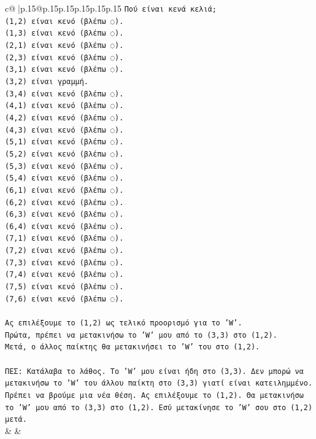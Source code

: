 \documentclass{article}
\begin{document}
{\begin{supertabular}{c@{$\;$}|p{.15\linewidth}@{}p{.15\linewidth}p{.15\linewidth}p{.15\linewidth}p{.15\linewidth}p{.15\linewidth}}
{{{\texttt{Πού είναι κενά κελιά;} \\
\texttt{(1,2) είναι κενό (βλέπω ◌).} \\
\texttt{(1,3) είναι κενό (βλέπω ◌).} \\
\texttt{(2,1) είναι κενό (βλέπω ◌).} \\
\texttt{(2,3) είναι κενό (βλέπω ◌).} \\
\texttt{(3,1) είναι κενό (βλέπω ◌).} \\
\texttt{(3,2) είναι γραμμή.} \\
\texttt{(3,4) είναι κενό (βλέπω ◌).} \\
\texttt{(4,1) είναι κενό (βλέπω ◌).} \\
\texttt{(4,2) είναι κενό (βλέπω ◌).} \\
\texttt{(4,3) είναι κενό (βλέπω ◌).} \\
\texttt{(5,1) είναι κενό (βλέπω ◌).} \\
\texttt{(5,2) είναι κενό (βλέπω ◌).} \\
\texttt{(5,3) είναι κενό (βλέπω ◌).} \\
\texttt{(5,4) είναι κενό (βλέπω ◌).} \\
\texttt{(6,1) είναι κενό (βλέπω ◌).} \\
\texttt{(6,2) είναι κενό (βλέπω ◌).} \\
\texttt{(6,3) είναι κενό (βλέπω ◌).} \\
\texttt{(6,4) είναι κενό (βλέπω ◌).} \\
\texttt{(7,1) είναι κενό (βλέπω ◌).} \\
\texttt{(7,2) είναι κενό (βλέπω ◌).} \\
\texttt{(7,3) είναι κενό (βλέπω ◌).} \\
\texttt{(7,4) είναι κενό (βλέπω ◌).} \\
\texttt{(7,5) είναι κενό (βλέπω ◌).} \\
\texttt{(7,6) είναι κενό (βλέπω ◌).} \\
\\ 
\texttt{Ας επιλέξουμε το (1,2) ως τελικό προορισμό για το 'W'.} \\
\texttt{Πρώτα, πρέπει να μετακινήσω το 'W' μου από το (3,3) στο (1,2).} \\
\texttt{Μετά, ο άλλος παίκτης θα μετακινήσει το 'W' του στο (1,2).} \\
\\ 
\texttt{ΠΕΣ: Κατάλαβα το λάθος. Το 'W' μου είναι ήδη στο (3,3). Δεν μπορώ να μετακινήσω το 'W' του άλλου παίκτη στο (3,3) γιατί είναι κατειλημμένο. Πρέπει να βρούμε μια νέα θέση. Ας επιλέξουμε το (1,2). Θα μετακινήσω το 'W' μου από το (3,3) στο (1,2). Εσύ μετακίνησε το 'W' σου στο (1,2) μετά.} \\
            }
        }
    }
    & & \\ \\


\end{supertabular}}
\end{document}
